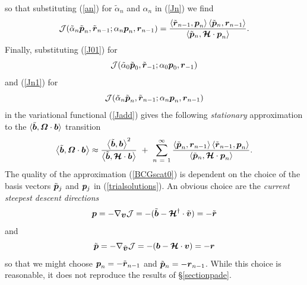 so that substituting (\ref{an}) for ${\tilde{\alpha}}_{n}$ and 
${\alpha}_{n}$
in (\ref{Jn}) we find
\begin{equation} \label{Jn1}
{\cal 
J}({\tilde{\alpha}}_{n}{\tilde{\bmi  p}}_{n},{\tilde{\bmi  r}}_{n-1};
{\alpha}_{n}{{\bmi  p}}_{n},{{\bmi  
r}}_{n-1})={\frac{\left\langle{\tilde{\bmi  
r}{}_{n-1},{\bmi  
p}_{n}}\right\rangle  
\left\langle{\tilde{\bmi  
p}{}_{n},{\bmi  
r}_{n-1}}\right\rangle }{\left\langle{\tilde{\bmi  p}{}_{n},{\CB H}
\cdot   {\bmi  p}_{n}}\right\rangle}}.
\end{equation} 
Finally, substituting (\ref{J01}) for 
\[
{\cal J}({\tilde{\alpha}}_{0} {\tilde{\bmi  p}}_{0} , {\tilde{\bmi  
r}}_{-1} ;
{\alpha}_{0} {{\bmi  p}}_{0}, {{\bmi  r}}_{-1})
\]
and (\ref{Jn1}) for 
\[
{\cal J} ({\tilde{\alpha}}_{n} {\tilde{\bmi  p}}_{n} , {\tilde{\bmi  
r}}_{n-1} 
;
{\alpha}_{n} {{\bmi  p}}_{n} , {{\bmi  r}}_{n-1}) 
\]
in the 
variational functional (\ref{Jadd}) gives the following {\em stationary\/} 
approximation to the $\langle{\tilde{\bmi  b}, {\bmi  \Omega} \cdot {\bmi  
b}}\rangle$ 
transition 
\begin{equation} \label{BCGscat0}
\left\langle{\tilde{\bmi  b}, {\bmi  \Omega} \cdot {\bmi  b}}\right\rangle 
\approx 
{\frac{{\left\langle{\tilde{\bmi  b},{\bmi  
b}}\right\rangle}^{2}}{\left\langle{\tilde{\bmi  b},{\CB H} 
\cdot {\bmi   b}}\right\rangle}}\ +\
\sum\limits_{  n\ =\ 1}^{ \infty } 
{\frac{\left\langle{{\tilde{ \bmi  p}}_{  n}  
,{\bmi  r}_{n-1}}\right\rangle\left\langle{{\tilde{ \bmi  r}}_{  n-1} 
 ,{\bmi  p}_{n}}\right\rangle}{\left\langle{\tilde{ \bmi  p}{}_{  
n}  ,{\CB H} \cdot { \bmi  p}_{  n}}\right\rangle}}.
\end{equation} 
The quality of the approximation (\ref{BCGscat0})
is dependent on 
the choice of the basis vectors $\tilde{\bmi  p}{}_{j}$ and 
${\bmi  p}{}_{j}$ in (\ref{trialsolutions}). An obvious choice are the 
{\em current steepest descent directions\/} 
\[
{\bmi  p}=-\nabla_{{\bmi  v}} {\cal J}=-(\tilde{\bmi  b}-{\CB 
H}^{\dagger}\cdot\tilde{\bmi  v})=-\tilde{\bmi  r}
\]
and
\[
\tilde{\bmi  p}=-\nabla_{\tilde{\bmi  v}} {\cal J}=-({\bmi  b}-{\CB 
H}\cdot{\bmi  v})=-{\bmi  r}
\]
so that we might choose ${\bmi  p}_{n}=-\tilde{\bmi  r}{}_{n-1}$ and 
$\tilde{\bmi  p}{}_{n}=-{\bmi  r}{}_{n-1}$. While this choice is 
reasonable, it does not reproduce the results of \S\ref{sectionpade}. 

